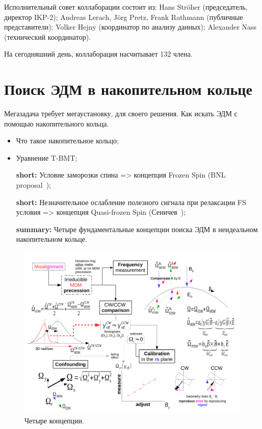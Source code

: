 \documentclass{extarticle}
\begin{document}
Исполнительный совет коллаборации состоит из: Hans Str\"oher (председатель, директор IKP-2); Andreas Lerach, J\"org Pretz, Frank Rathmann (публичные представители); Volker Hejny (координатор по анализу данных); Alexander Nass (технический координатор). 

На сегодняшний день, коллаборация насчитывает 132 члена.

\section{Поиск ЭДМ в накопительном кольце}
Мегазадача требует мегаустановку, для своего решения. Как искать ЭДМ с помощью накопительного кольца.
	\begin{itemize}
		\item Что такое накопительное кольцо;
		\item Уравнение T-BMT;
		\item[\textbf{short:}] Условие заморозки спина => концепция Frozen Spin (BNL proposal~\cite{BNL});
		\item[\textbf{short:}] Незначительное ослабление полезного сигнала при релаксации FS условия => концепция Quasi-frozen Spin (Сеничев~\cite{Senichev});
		\item[\textbf{summary:}] Четыре фундаментальные концепции поиска ЭДМ в неидеальном накопительном кольце.
	\end{itemize}
	
\begin{figure}
	\centering
	\includegraphics[scale=.6]{TheFourConcepts.pdf}
	\caption{Четыре концепции.}
\end{figure}
\end{document}
